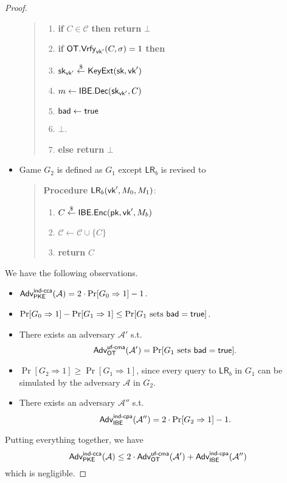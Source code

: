 \documentclass[12pt]{article}
\newcommand{\getsr}{\stackrel{\$}{\gets}}
\newcommand{\Adv}{\textsf{Adv}}
\newcommand{\tab}{\hspace{0.3in}}
\newcommand{\Vrfy}{\textsf{Vrfy}}
\newcommand{\true}{\textsf{true}}
\newcommand{\C}{\mathcal{C}}
\theoremstyle{definition}
\newcommand{\PKE}{\textsf{PKE}}
\newcommand{\Enc}{\textsf{Enc}}
\newcommand{\Dec}{\textsf{Dec}}
\newcommand{\pk}{\textsf{pk}}
\newcommand{\sk}{\textsf{sk}}
\newcommand{\A}{\mathcal{A}}
\newcommand{\LR}{\textsf{LR}}
\begin{document}
\begin{proof}
\begin{itemize}
\begin{quote}
\begin{enumerate}
\item {\bf if} $C \in \C$ {\bf then return} $\bot$
\item {\bf if} $\OT.\Vrfy_{\vk'}(C,\sigma)=1$ {\bf then}
\item \tab $\sk_{\vk'} \getsr \KeyExt(\sk, \vk')$
\item \tab $m \gets \IBE.\Dec(\sk_{\vk'}, C)$
\item \tab $\bad \gets \true$
\item \tab {\bf return} $\bot$.
\item {\bf else return} $\bot$
\end{enumerate}
\end{quote}
\item Game $G_2$ is defined as $G_1$ except $\LR_b$ is revised to
\begin{quote}
{\bf Procedure} $\LR_b(\vk',M_0,M_1)$:
\begin{enumerate}
\item $C \getsr \IBE.\Enc(\pk,\vk',M_b)$
\item $\C \gets \C \cup \{C\}$
\item {\bf return} $C$
\end{enumerate}
\end{quote}
\end{itemize}
We have the following observations.
\begin{itemize}
\item $\Adv_{\PKE}^{\cca}(\A) = 2\cdot\Pr[G_0 \Rightarrow 1]-1$.
\item $\Pr[G_0 \Rightarrow 1] - \Pr[G_1 \Rightarrow 1] \leq \Pr[\textrm{$G_1$ sets $\bad = \true$}]$.
\item There exists an adversary $\A'$ s.t. 
	$$\Adv_{\OT}^{\textsf{uf-cma}}(\A') = \Pr[\textrm{$G_1$ sets $\bad = \true$}].$$
\item $\Pr[G_2 \Rightarrow 1] \geq \Pr[G_1 \Rightarrow 1]$, since every query to $\LR_b$ in $G_1$ can be simulated by the adversary $\A$ in $G_2$.
\item There exists an adversary $\A''$ s.t.
$$\Adv_{\IBE}^{\cpa}(\A'') = 2\cdot\Pr[G_2 \Rightarrow 1] - 1.$$
\end{itemize}
Putting everything together, we have
$$\Adv_{\PKE}^{\cca}(\A) \leq 2\cdot\Adv_{\OT}^{\textsf{uf-cma}}(\A') + \Adv_{\IBE}^{\cpa}(\A'')$$
which is negligible.
\end{proof}
\end{document}
